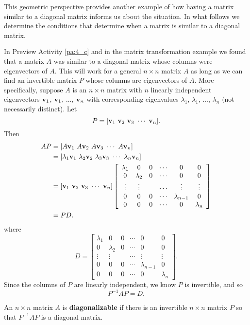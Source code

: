 This geometric perspective provides another example of how having a matrix similar to a diagonal matrix informs us about the situation. In what follows we determine the conditions that determine when a matrix is similar to a diagonal matrix. 

\label{sec:diag_general}

In Preview Activity \ref{pa:4_c} and in the matrix transformation example we found that a matrix $A$ was similar to a diagonal matrix whose columns were eigenvectors of $A$. This will work for a general $n \times n$ matrix $A$ as long as we can find an invertible matrix $P$ whose columns are eigenvectors of $A$. More specifically, suppose $A$ is an $n \times n$ matrix with $n$ linearly independent eigenvectors $\mathbf{v}_1$, $\mathbf{v}_1$, $\ldots$, $\mathbf{v}_n$ with corresponding eigenvalues $\lambda_1$, $\lambda_1$, $\ldots$, $\lambda_n$ (not necessarily distinct). Let
\[P = [ \mathbf{v}_1 \  \mathbf{v}_2  \ \mathbf{v}_3  \ \cdots  \ \mathbf{v}_n].\]
Then
\begin{align*}
AP &= [ A\vv_1  \ A\vv_2  \ A\vv_3  \ \cdots  \ A\vv_n] \\
    &= [ \lambda_1\vv_1  \ \lambda_2\vv_2  \ \lambda_3\vv_3  \ \cdots  \ \lambda_n\vv_n] \\
    &= [ \vv_1 \  \vv_2  \ \vv_3  \ \cdots  \ \vv_n]\left[ \begin{array}{cccccc} \lambda_1&0&0&\cdots&0&0 \\ 0&\lambda_2&0&\cdots&0&0 \\ \vdots&\vdots&& \cdots&\vdots&\vdots \\ 0&0&0&\cdots&\lambda_{n-1}&0 \\  0&0&0&\cdots&0&\lambda_{n} \end{array} \right] \\
    &= P D.
\end{align*}
where 
\[D = \left[ \begin{array}{cccccc} \lambda_1&0&0&\cdots&0&0 \\ 0&\lambda_2&0&\cdots&0&0 \\ \vdots&\vdots&& \cdots&\vdots&\vdots \\ 0&0&0&\cdots&\lambda_{n-1}&0 \\  0&0&0&\cdots&0&\lambda_{n} \end{array} \right].\]
Since the columns of $P$ are linearly independent, we know $P$ is invertible, and so
\[P^{-1}AP = D.\]



\begin{definition} An $n \times n$ matrix $A$ is \textbf{diagonalizable} if there is an invertible $n \times n$ matrix $P$ so that $P^{-1}AP$ is a diagonal matrix.
\end{definition}



